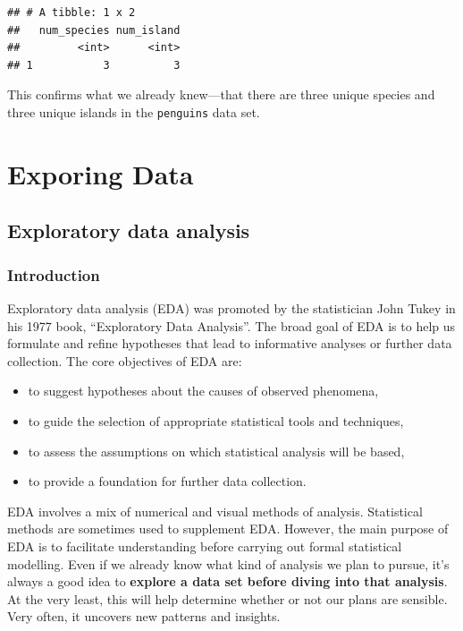 \documentclass[
]{book}
\providecommand{\tightlist}{%
  \setlength{\itemsep}{0pt}\setlength{\parskip}{0pt}}
\begin{document}
\begin{verbatim}
## # A tibble: 1 x 2
##   num_species num_island
##         <int>      <int>
## 1           3          3
\end{verbatim}

This confirms what we already knew---that there are three unique species and three unique islands in the \texttt{penguins} data set.

\hypertarget{part-exporing-data}{%
\part{Exporing Data}\label{part-exporing-data}}

\hypertarget{exploratory-data-analysis}{%
\chapter{Exploratory data analysis}\label{exploratory-data-analysis}}

\hypertarget{introduction-6}{%
\section{Introduction}\label{introduction-6}}

Exploratory data analysis (EDA) was promoted by the statistician John Tukey in his 1977 book, ``Exploratory Data Analysis''. The broad goal of EDA is to help us formulate and refine hypotheses that lead to informative analyses or further data collection. The core objectives of EDA are:

\begin{itemize}
\tightlist
\item
  to suggest hypotheses about the causes of observed phenomena,
\item
  to guide the selection of appropriate statistical tools and techniques,
\item
  to assess the assumptions on which statistical analysis will be based,
\item
  to provide a foundation for further data collection.
\end{itemize}

EDA involves a mix of numerical and visual methods of analysis. Statistical methods are sometimes used to supplement EDA. However, the main purpose of EDA is to facilitate understanding before carrying out formal statistical modelling. Even if we already know what kind of analysis we plan to pursue, it's always a good idea to \textbf{explore a data set before diving into that analysis}. At the very least, this will help determine whether or not our plans are sensible. Very often, it uncovers new patterns and insights.
\end{document}
